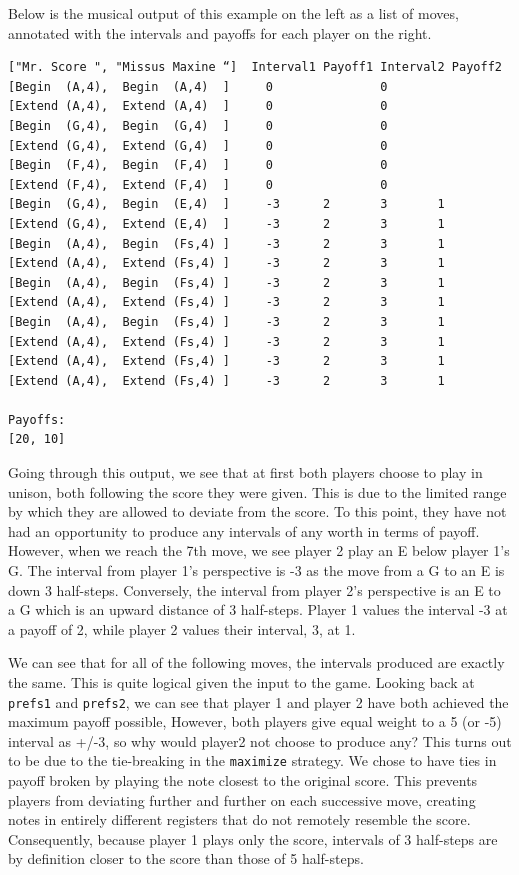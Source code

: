 \documentclass{article}
\begin{document}
Below is the musical output of this example on the left as a list of
moves, annotated with the intervals and payoffs for each player on the
right.

\begin{verbatim}
["Mr. Score ", "Missus Maxine “]  Interval1 Payoff1 Interval2 Payoff2
[Begin  (A,4),  Begin  (A,4)  ]     0               0        
[Extend (A,4),  Extend (A,4)  ]     0               0        
[Begin  (G,4),  Begin  (G,4)  ]     0               0        
[Extend (G,4),  Extend (G,4)  ]     0               0        
[Begin  (F,4),  Begin  (F,4)  ]     0               0        
[Extend (F,4),  Extend (F,4)  ]     0               0        
[Begin  (G,4),  Begin  (E,4)  ]     -3      2       3       1
[Extend (G,4),  Extend (E,4)  ]     -3      2       3       1
[Begin  (A,4),  Begin  (Fs,4) ]     -3      2       3       1
[Extend (A,4),  Extend (Fs,4) ]     -3      2       3       1
[Begin  (A,4),  Begin  (Fs,4) ]     -3      2       3       1
[Extend (A,4),  Extend (Fs,4) ]     -3      2       3       1
[Begin  (A,4),  Begin  (Fs,4) ]     -3      2       3       1
[Extend (A,4),  Extend (Fs,4) ]     -3      2       3       1
[Extend (A,4),  Extend (Fs,4) ]     -3      2       3       1
[Extend (A,4),  Extend (Fs,4) ]     -3      2       3       1

Payoffs:
[20, 10]
\end{verbatim}

Going through this output, we see that at first both players choose to
play in unison, both following the score they were given. This is due to
the limited range by which they are allowed to deviate from the score.
To this point, they have not had an opportunity to produce any intervals
of any worth in terms of payoff. However, when we reach the 7th move, we
see player 2 play an E below player 1's G. The interval from player 1's 
perspective is -3 as the move from a G to an E is down 3 half-steps. 
Conversely, the interval from player 2's perspective is an E to a G which is 
an upward distance of 3 half-steps.  Player 1 values the interval -3 at a 
payoff of 2, while player 2 values their interval, 3, at 1.

We can see that for all of the following moves, the intervals produced
are exactly the same. This is quite logical given the input to the game.
Looking back at \texttt{prefs1} and \texttt{prefs2}, we can see that player 1 and player 2
have both achieved the maximum payoff possible,
However, both players give equal weight to a 5 (or -5) interval as +/-3,
so why would player2 not choose to produce any? This turns out to be due
to the tie-breaking in the \texttt{maximize} strategy. We chose to have ties in
payoff broken by playing the note closest to the original score. This
prevents players from deviating further and further on each successive move,
creating notes in entirely different registers that do not remotely
resemble the score. Consequently, because player 1 plays only the score,
intervals of 3 half-steps are by definition closer to the score than
those of 5 half-steps.
\end{document}
